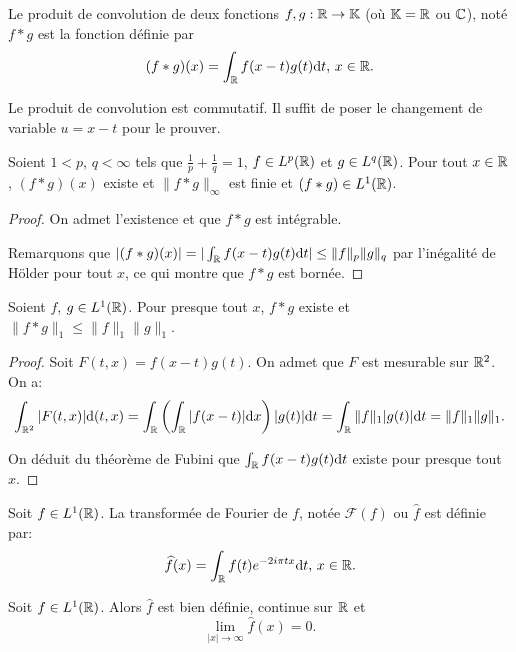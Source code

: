 \begin{df}
Le produit de convolution de deux fonctions $f, g:\mathbb{R}\to\mathbb{K}$
(où $\mathbb{K} = \mathbb{R}$ ou $\mathbb{C}$), noté $f * g$ est la fonction définie par
$$(f * g)(x) = \int_{\mathbb{R}}f(x-t)g(t)\mathrm{d} t\mbox{, } x\in\mathbb{R}.$$
\end{df}

Le produit de convolution est commutatif. Il suffit de poser
le changement de variable $u = x - t$ pour le prouver.

\begin{thm}%
  Soient $1 < p$, $q <\infty$ tels que $\frac{1}{p} + \frac{1}{q} = 1$,
  $f\in L^p(\mathbb{R})$ et $g\in L^q(\mathbb{R})$.
  Pour tout $x\in \mathbb{R}$, $(f * g)(x)$ existe et $\|f * g\|_\infty$ est finie
  et $(f * g)\in L^1(\mathbb{R})$.
\end{thm}

\begin{proof}
  On admet l'existence et que $f * g$ est intégrable.

  Remarquons que $|(f  * g)(x)| =
  |\int_{\mathbb{R}}f(x-t)g(t)\mathrm{d} t | \leq \|f\|_p \|g\|_q$ par l'inégalité de Hölder
  pour tout $x$, ce qui montre que $f * g$ est bornée.
\end{proof}

\begin{thm}
  Soient $f$, $g\in L^1(\mathbb{R})$. Pour presque tout $x$, $f * g$ existe et
  $\|f * g \|_1\leq \|f\|_1 \|g\|_1$.
\end{thm}
\begin{proof}
  Soit $F(t, x) = f(x - t)g(t)$. On admet que $F$ est mesurable sur $\mathbb{R}^2$.
  On a:
  $$\int_{\mathbb{R}^2}|F(t, x)|\mathrm{d}(t, x) =
  \int_{\mathbb{R}} \left(\int_{\mathbb{R}}|f(x - t)| \mathrm{d} x\right) |g(t)|\mathrm{d} t =
  \int_{\mathbb{R}} \|f\|_1 |g(t)|\mathrm{d} t = \|f\|_1 \|g\|_1.$$

  On déduit du théorème de Fubini que $\int_{\mathbb{R}} f(x - t) g(t) \mathrm{d} t$ existe
  pour presque tout $x$.
\end{proof}

\begin{df}
Soit $f\in L^1(\mathbb{R})$. La transformée de Fourier de $f$, notée $\mathcal F(f)$
ou $\widehat{f}$ est définie par:
$$\widehat{f}(x) = \int_{\mathbb{R}} f(t) e^{-2i\pi t x}\mathrm{d} t\mbox{, } x\in \mathbb{R}.$$
\end{df}

\begin{prop}
  Soit $f\in L^1(\mathbb{R})$. Alors $\widehat{f}$ est bien définie,
  continue sur $\mathbb{R}$ et
  $$\lim_{|x|\to\infty}\widehat{f}(x) = 0.$$
\end{prop}

